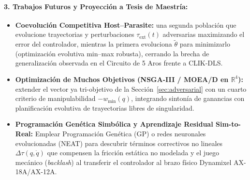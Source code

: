 \documentclass[11pt,a4paper]{article}
\begin{document}
\paragraph{3. Trabajos Futuros y Proyección a Tesis de Maestría:}
\begin{itemize}
    \item \textbf{Coevolución Competitiva Host--Parasite:} una segunda población que evolucione trayectorias y perturbaciones $\tau_{\text{ext}}(t)$ adversarias maximizando el error del controlador, mientras la primera evoluciona $\tilde{\theta}$ para minimizarlo (optimización evolutiva min--max robusta), cerrando la brecha de generalización observada en el Circuito de 5 Aros frente a CLIK-DLS.
    \item \textbf{Optimización de Muchos Objetivos (NSGA-III / MOEA/D en $\mathbb{R}^4$):} extender el vector ya tri-objetivo de la Sección~\ref{sec:adversarial} con un cuarto criterio de manipulabilidad $-w_{\min}(q)$, integrando sintonía de ganancias con planificación evolutiva de trayectorias libres de singularidad.
    \item \textbf{Programación Genética Simbólica y Aprendizaje Residual Sim-to-Real:} Emplear Programación Genética (GP) o redes neuronales evolucionadas (NEAT) para descubrir términos correctivos no lineales $\Delta\tau(q,\dot{q})$ que compensen la fricción estática no modelada y el juego mecánico (\textit{backlash}) al transferir el controlador al brazo físico Dynamixel AX-18A/AX-12A.
\end{itemize}
\end{document}

